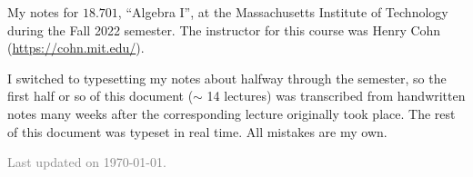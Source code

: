 \documentclass[11pt]{article}
\begin{document}
\maketitle

My notes for $18.701$, ``Algebra I'', at the Massachusetts Institute of Technology during the Fall 2022 semester. The instructor for this course was Henry Cohn (\url{https://cohn.mit.edu/}). 

I switched to typesetting my notes about halfway through the semester, so the first half or so of this document ($\sim$ 14 lectures) was transcribed from handwritten notes many weeks after the corresponding lecture originally took place. The rest of this document was typeset in real time. All mistakes are my own. 

\vfill

\hfill \textcolor{gray}{\small Last updated on \today.}
\newpage
\tableofcontents 
\newpage
\importfiles %
\end{document}
